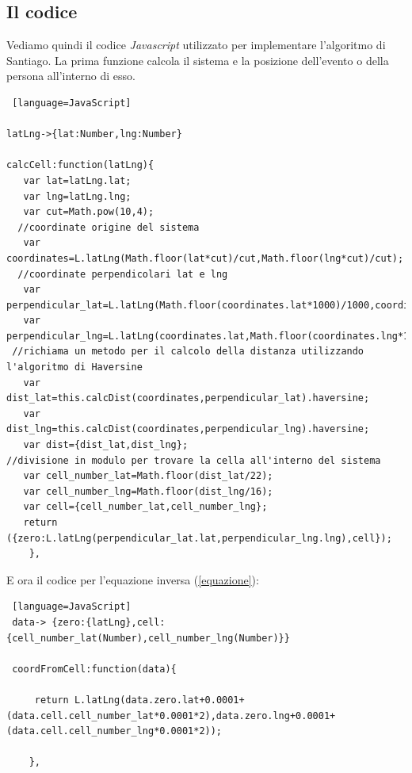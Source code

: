 \subsection{Il codice}
Vediamo quindi il codice \textit{Javascript} utilizzato per implementare l'algoritmo di Santiago. La prima funzione calcola il sistema e la posizione dell'evento o della persona all'interno di esso.
\begin{lstlisting} [language=JavaScript]

latLng->{lat:Number,lng:Number}

calcCell:function(latLng){
   var lat=latLng.lat;
   var lng=latLng.lng;
   var cut=Math.pow(10,4); 
  //coordinate origine del sistema
   var coordinates=L.latLng(Math.floor(lat*cut)/cut,Math.floor(lng*cut)/cut);  
  //coordinate perpendicolari lat e lng
   var perpendicular_lat=L.latLng(Math.floor(coordinates.lat*1000)/1000,coordinates.lng); 
   var perpendicular_lng=L.latLng(coordinates.lat,Math.floor(coordinates.lng*1000)/1000);  
 //richiama un metodo per il calcolo della distanza utilizzando l'algoritmo di Haversine
   var dist_lat=this.calcDist(coordinates,perpendicular_lat).haversine; 
   var dist_lng=this.calcDist(coordinates,perpendicular_lng).haversine;
   var dist={dist_lat,dist_lng};
//divisione in modulo per trovare la cella all'interno del sistema
   var cell_number_lat=Math.floor(dist_lat/22);
   var cell_number_lng=Math.floor(dist_lng/16);
   var cell={cell_number_lat,cell_number_lng};
   return ({zero:L.latLng(perpendicular_lat.lat,perpendicular_lng.lng),cell});
	},
\end{lstlisting}
\newpage

E ora il codice per l'equazione inversa (\ref{equazione}):
 \begin{lstlisting} [language=JavaScript]
 data-> {zero:{latLng},cell:{cell_number_lat(Number),cell_number_lng(Number)}}
 
 coordFromCell:function(data){

	 return L.latLng(data.zero.lat+0.0001+(data.cell.cell_number_lat*0.0001*2),data.zero.lng+0.0001+(data.cell.cell_number_lng*0.0001*2));
	 
	},
\end{lstlisting}
\newpage

